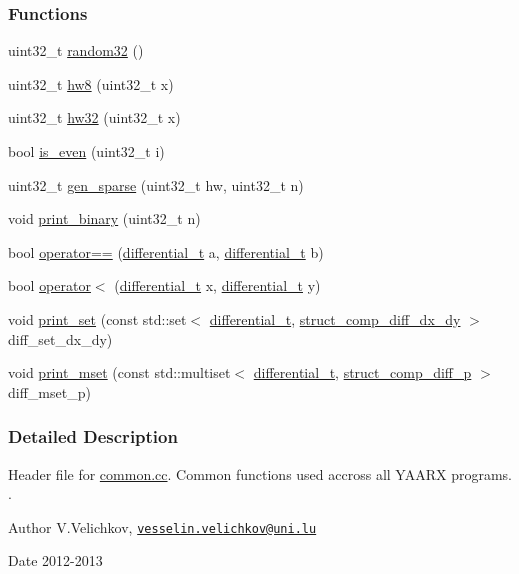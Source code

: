 \subsubsection*{\-Functions}
\begin{DoxyCompactItemize}
\item 
uint32\-\_\-t \hyperlink{common_8hh_a74a318bbae856b2de48ba7490e0460af}{random32} ()
\item 
uint32\-\_\-t \hyperlink{common_8hh_ac110ff0403257ed770df8e450e361ed2}{hw8} (uint32\-\_\-t x)
\item 
uint32\-\_\-t \hyperlink{common_8hh_ae2becd1415d744a5c2677f7906db6814}{hw32} (uint32\-\_\-t x)
\item 
bool \hyperlink{common_8hh_aff61bc916d0b070ad7b20a0b3456c604}{is\-\_\-even} (uint32\-\_\-t i)
\item 
uint32\-\_\-t \hyperlink{common_8hh_a7bb79c007f5ff830bae611240282423d}{gen\-\_\-sparse} (uint32\-\_\-t hw, uint32\-\_\-t n)
\item 
void \hyperlink{common_8hh_abb770b16d18b918de6a9ccab6eea0aa0}{print\-\_\-binary} (uint32\-\_\-t n)
\item 
bool \hyperlink{common_8hh_ab03f26f2196400d02ff59e0190d5835b}{operator==} (\hyperlink{structdifferential__t}{differential\-\_\-t} a, \hyperlink{structdifferential__t}{differential\-\_\-t} b)
\item 
bool \hyperlink{common_8hh_aee906c0378ccfc3194fb7d8dc000ebbf}{operator$<$} (\hyperlink{structdifferential__t}{differential\-\_\-t} x, \hyperlink{structdifferential__t}{differential\-\_\-t} y)
\item 
void \hyperlink{common_8hh_a07108da601cf176205659534a26d1adf}{print\-\_\-set} (const std\-::set$<$ \hyperlink{structdifferential__t}{differential\-\_\-t}, \hyperlink{structstruct__comp__diff__dx__dy}{struct\-\_\-comp\-\_\-diff\-\_\-dx\-\_\-dy} $>$ diff\-\_\-set\-\_\-dx\-\_\-dy)
\item 
void \hyperlink{common_8hh_a4380adfd210e69fb36ef02c254da8fe0}{print\-\_\-mset} (const std\-::multiset$<$ \hyperlink{structdifferential__t}{differential\-\_\-t}, \hyperlink{structstruct__comp__diff__p}{struct\-\_\-comp\-\_\-diff\-\_\-p} $>$ diff\-\_\-mset\-\_\-p)
\end{DoxyCompactItemize}


\subsubsection{\-Detailed \-Description}
\-Header file for \hyperlink{common_8cc}{common.\-cc}. \-Common functions used accross all \-Y\-A\-A\-R\-X programs. . \begin{DoxyAuthor}{\-Author}
\-V.\-Velichkov, \href{mailto:vesselin.velichkov@uni.lu}{\tt vesselin.\-velichkov@uni.\-lu} 
\end{DoxyAuthor}
\begin{DoxyDate}{\-Date}
2012-\/2013 
\end{DoxyDate}


